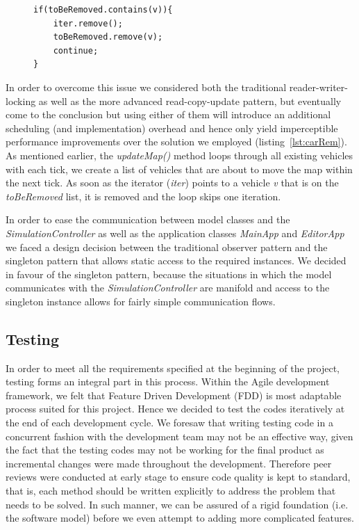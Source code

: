 \begin{figure}
	\begin{minipage}{0.45\textwidth}
		\begin{lstlisting}[caption={Car Removal}, label={lst:carRem}]
if(toBeRemoved.contains(v)){
	iter.remove();
	toBeRemoved.remove(v);
	continue;
}	
		\end{lstlisting}
	\end{minipage}
\end{figure}

In order to overcome this issue we considered both the traditional reader-writer-locking as well as the more advanced read-copy-update pattern, but eventually come to the conclusion but using either of them will introduce an additional scheduling (and implementation) overhead and hence only yield imperceptible performance improvements over the solution we employed (listing~\ref{lst:carRem}). As mentioned earlier, the \textit{updateMap()} method loops through all existing vehicles with each tick, we create a list of vehicles that are about to move the map within the next tick. As soon as the iterator (\textit{iter}) points to a vehicle \textit{v} that is on the \textit{toBeRemoved} list, it is removed and the loop skips one iteration.  

In order to ease the communication between model classes and the \textit{SimulationController} as well as the application classes \textit{MainApp} and \textit{EditorApp} we faced a design decision between the traditional observer pattern and the singleton pattern that allows static access to the required instances. We decided in favour of the singleton pattern, because the situations in which the model communicates with the \textit{SimulationController} are manifold and access to the singleton instance allows for fairly simple communication flows.

\subsection{Testing}
In order to meet all the requirements specified at the beginning of the project, testing forms an integral part in this process. Within the Agile development framework, we felt that Feature Driven Development (FDD) is most adaptable process suited for this project. Hence we decided to test the codes iteratively at the end of each development cycle. We foresaw that writing testing code in a concurrent fashion with the development team may not be an effective way, given the fact that the testing codes may not be working for the final product as incremental changes were made throughout the development. Therefore peer reviews were conducted at early stage to ensure  code quality is kept to standard, that is, each method should be written explicitly to address the problem that needs to be solved. In such manner, we can be assured of a rigid foundation (i.e. the software model) before we even attempt to adding more complicated features.

